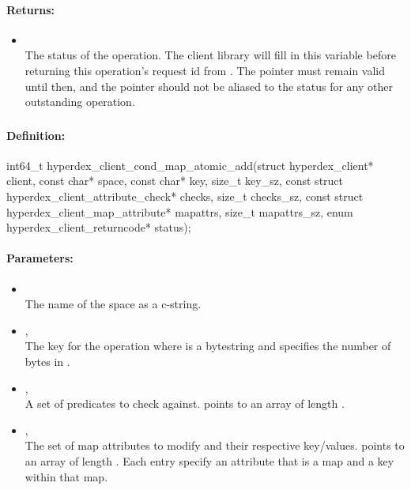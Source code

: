 \paragraph{Returns:}
\begin{itemize}[noitemsep]
\item {}\\
The status of the operation.  The client library will fill in this variable before returning this operation's request id from .  The pointer must remain valid until then, and the pointer should not be aliased to the status for any other outstanding operation.
\end{itemize}

\pagebreak
\subsubsection{}
\label{api:c:cond_map_atomic_add}


\paragraph{Definition:}
\begin{ccode}
int64_t hyperdex_client_cond_map_atomic_add(struct hyperdex_client* client,
        const char* space,
        const char* key, size_t key_sz,
        const struct hyperdex_client_attribute_check* checks, size_t checks_sz,
        const struct hyperdex_client_map_attribute* mapattrs, size_t mapattrs_sz,
        enum hyperdex_client_returncode* status);
\end{ccode}

\paragraph{Parameters:}
\begin{itemize}[noitemsep]
\item {}\\
The name of the space as a c-string.
\item {}, \\
The key for the operation where  is a bytestring and  specifies the number of bytes in .
\item {}, \\
A set of predicates to check against.   points to an array of length .
\item {}, \\
The set of map attributes to modify and their respective key/values.   points to an array of length .  Each entry specify an attribute that is a map and a key within that map.
\end{itemize}

